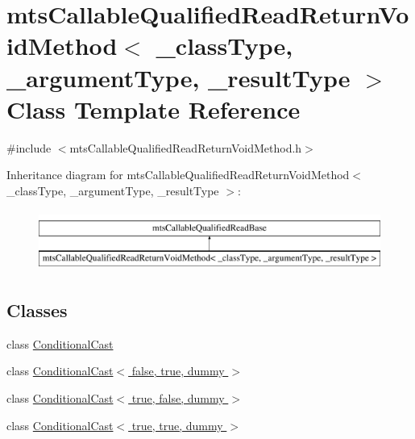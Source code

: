 \hypertarget{classmts_callable_qualified_read_return_void_method}{\section{mts\-Callable\-Qualified\-Read\-Return\-Void\-Method$<$ \-\_\-class\-Type, \-\_\-argument\-Type, \-\_\-result\-Type $>$ Class Template Reference}
\label{classmts_callable_qualified_read_return_void_method}
}


{\ttfamily \#include $<$mts\-Callable\-Qualified\-Read\-Return\-Void\-Method.\-h$>$}

Inheritance diagram for mts\-Callable\-Qualified\-Read\-Return\-Void\-Method$<$ \-\_\-class\-Type, \-\_\-argument\-Type, \-\_\-result\-Type $>$\-:\begin{figure}[H]
\begin{center}
\leavevmode
\includegraphics[height=2.000000cm]{d6/dcd/classmts_callable_qualified_read_return_void_method}
\end{center}
\end{figure}
\subsection*{Classes}
\begin{DoxyCompactItemize}
\item 
class \hyperlink{classmts_callable_qualified_read_return_void_method_1_1_conditional_cast}{Conditional\-Cast}
\item 
class \hyperlink{classmts_callable_qualified_read_return_void_method_1_1_conditional_cast_3_01false_00_01true_00_01dummy_01_4}{Conditional\-Cast$<$ false, true, dummy $>$}
\item 
class \hyperlink{classmts_callable_qualified_read_return_void_method_1_1_conditional_cast_3_01true_00_01false_00_01dummy_01_4}{Conditional\-Cast$<$ true, false, dummy $>$}
\item 
class \hyperlink{classmts_callable_qualified_read_return_void_method_1_1_conditional_cast_3_01true_00_01true_00_01dummy_01_4}{Conditional\-Cast$<$ true, true, dummy $>$}
\end{DoxyCompactItemize}
